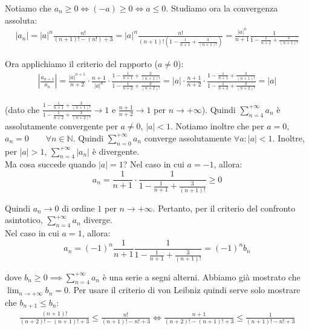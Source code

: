\documentclass{article}
\begin{document}
\noindent Notiamo che $a_n \geq 0 \iff (-a) \geq 0 \iff a \leq 0$. Studiamo ora la convergenza assoluta:
\begin{align*}
    |a_n| = |a|^n \frac{n!}{(n + 1)! - (n!) + 3} = |a|^n \frac{n!}{(n + 1)!(1 - \frac{1}{n + 1} + \frac{3}{(n + 1)!})} = \frac{|a|^n}{n + 1} \frac{1}{1 - \frac{1}{n + 1} + \frac{3}{(n + 1)!}}
\end{align*}

\noindent Ora applichiamo il criterio del rapporto ($a \neq 0$):
\begin{align*}
    \left|\frac{a_{n + 1}}{a_n}\right| = \frac{|a|^{n + 1}}{n + 2} \cdot \frac{n + 1}{|a|^n} \cdot \frac{1 - \frac{1}{n + 1} + \frac{3}{(n + 1)!}}{1 - \frac{1}{n + 2} + \frac{3}{(n + 2)!}} = |a| \cdot \frac{n + 1}{n + 2} \cdot\frac{1 - \frac{1}{n + 1} + \frac{3}{(n + 1)!}}{1 - \frac{1}{n + 2} + \frac{3}{(n + 2)!}} = |a|
\end{align*}

\noindent (dato che $\frac{1 - \frac{1}{n + 1} + \frac{3}{(n + 1)!}}{1 - \frac{1}{n + 2} + \frac{3}{(n + 2)!}} \to 1$ e $\frac{n + 1}{n + 2} \to 1$ per $n \to +\infty$). Quindi $\sum_{n = 4}^{+\infty} a_n$ è assolutamente convergente per $a \neq 0$, $|a| < 1$. Notiamo inoltre che per $a = 0$, $a_n = 0 \qquad \forall n \in \mathbb{N}$. Quindi $\sum_{n = 0}^{+\infty} a_n$ converge assolutamente $\forall a : |a| < 1$. Inoltre, per $|a| > 1$, $\sum_{n = 4}^{+\infty} |a_n|$ è divergente.\\
Ma cosa succede quando $|a| = 1$? Nel caso in cui $a = - 1$, allora:
\begin{equation*}
    a_n = \frac{1}{n + 1} \cdot \frac{1}{1 - \frac{1}{n + 1} + \frac{3}{(n + 1)!}} \geq 0
\end{equation*}

\noindent Quindi $a_n \to 0$ di ordine $1$ per $n \to +\infty$. Pertanto, per il criterio del confronto asintotico, $\sum_{n = 4}^{+\infty} a_n$ diverge.\\
Nel caso in cui $a = 1$, allora:
\begin{equation*}
    a_n = (-1)^n \frac{1}{n + 1} \frac{1}{1 - \frac{1}{n + 1} + \frac{3}{(n + 1)!}} = (-1)^n b_n 
\end{equation*}

\noindent dove $b_n \geq 0 \implies \sum_{n = 4}^{+\infty} a_n$ è una serie a segni alterni. Abbiamo già mostrato che $\lim_{n \to +\infty} b_n = 0$. Per usare il criterio di von Leibniz quindi serve solo mostrare che $b_{n + 1} \leq b_n$:
\begin{align*}
    \frac{(n + 1)!}{(n + 2)! - (n + 1)! + 3} \leq \frac{n!}{(n + 1)! - n! + 3} \iff \frac{n + 1}{(n + 2)! - (n + 1)! + 3} \leq \frac{1}{(n + 1)! - n! + 3}
\end{align*}
\end{document}
